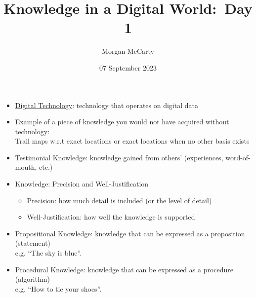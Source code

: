 \documentclass[12pt]{article}
\title{
    Knowledge in a Digital World:\ Day 1}
\author{Morgan McCarty}
\date{07 September 2023}
\begin{document}
    \maketitle

    \begin{itemize}
        \item \underline{Digital Technology}: technology that operates on digital data
        \item Example of a piece of knowledge you would not have acquired without technology: \\
        Trail maps w.r.t exact locations or exact locations when no other basis exists
        \item Testimonial Knowledge: knowledge gained from others' (experiences, word-of-mouth, etc.)
        \item Knowledge: Precision and Well-Justification
        \begin{itemize}
            \item Precision: how much detail is included (or the level of detail)
            \item Well-Justification: how well the knowledge is supported
        \end{itemize}
        \item Propositional Knowledge: knowledge that can be expressed as a proposition (statement) \\
        e.g. ``The sky is blue''.
        \item Procedural Knowledge: knowledge that can be expressed as a procedure (algorithm) \\
        e.g. ``How to tie your shoes''.
    \end{itemize}
\end{document}
